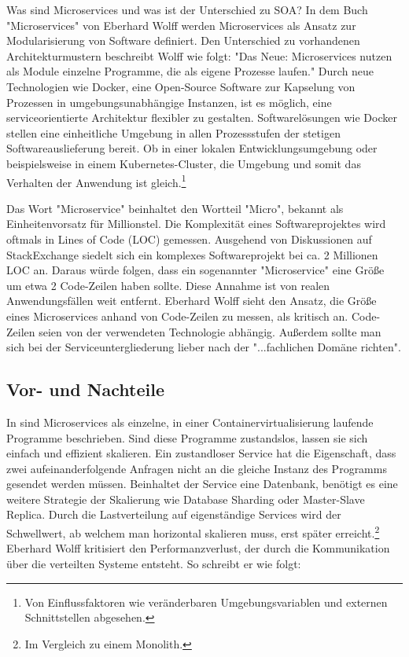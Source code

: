 Was sind Microservices und was ist der Unterschied zu SOA?
In dem Buch "Microservices" von Eberhard Wolff werden Microservices als Ansatz zur Modularisierung
von Software definiert. Den Unterschied zu vorhandenen Architekturmustern beschreibt Wolff wie folgt:
"Das Neue: Microservices nutzen als Module einzelne
Programme, die als eigene Prozesse laufen."\cite[S. 2]{MicroservicesBook}
Durch neue Technologien wie Docker, eine Open-Source Software
zur Kapselung von Prozessen in umgebungsunabhängige Instanzen, \cite{DockerOverview}
ist es möglich, eine serviceorientierte Architektur flexibler
zu gestalten. Softwarelösungen wie Docker stellen eine einheitliche Umgebung in
allen Prozessstufen der stetigen Softwareauslieferung bereit.
Ob in einer lokalen Entwicklungsumgebung oder beispielsweise in einem
Kubernetes-Cluster, die Umgebung und somit das
Verhalten der Anwendung ist gleich.\footnote{Von Einflussfaktoren
wie veränderbaren Umgebungsvariablen und externen Schnittstellen abgesehen.}

Das Wort "Microservice" beinhaltet den Wortteil "Micro",
bekannt als Einheitenvorsatz für Millionstel. Die Komplexität eines Softwareprojektes
wird oftmals in Lines of Code (LOC) gemessen. Ausgehend
von Diskussionen auf StackExchange siedelt sich ein komplexes Softwareprojekt bei
ca. 2 Millionen LOC an.\cite{ProjectsizeStackexchange}
Daraus würde folgen, dass ein sogenannter "Microservice" eine Größe um etwa
2 Code-Zeilen haben sollte. Diese Annahme ist von realen
Anwendungsfällen weit entfernt. Eberhard Wolff sieht den Ansatz,
die Größe eines Microservices anhand von Code-Zeilen zu
messen, als kritisch an. Code-Zeilen seien von der verwendeten
Technologie abhängig. Außerdem sollte man sich bei der
Serviceuntergliederung lieber nach der "...fachlichen Domäne richten".\cite[S. 31 und 32]{MicroservicesBook}

\subsection{Vor- und Nachteile}
\label{subsec:vorundnachteile}
In  sind Microservices
als einzelne, in einer Containervirtualisierung laufende Programme beschrieben. Sind diese Programme
zustandslos, lassen sie sich einfach und effizient skalieren. Ein zustandloser Service hat die Eigenschaft, dass zwei
aufeinanderfolgende Anfragen nicht an die gleiche Instanz des Programms gesendet werden müssen.
Beinhaltet der Service eine Datenbank, benötigt es eine weitere Strategie der Skalierung
wie Database Sharding oder Master-Slave Replica. Durch die Lastverteilung auf eigenständige Services
wird der Schwellwert, ab welchem man horizontal skalieren muss, erst später erreicht.\footnote{Im Vergleich zu einem Monolith.}
Eberhard Wolff kritisiert den Performanzverlust, der durch die
Kommunikation über die verteilten Systeme entsteht. So schreibt er wie folgt: 

